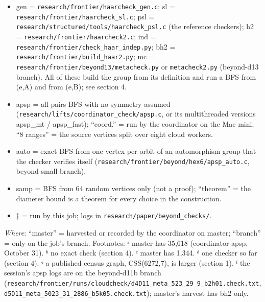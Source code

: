\documentclass[
  10pt,
]{article}
\providecommand{\tightlist}{%
  \setlength{\itemsep}{0pt}\setlength{\parskip}{0pt}}
\begin{document}
\begin{itemize}
\tightlist
\item
  gen = \texttt{research/\allowbreak{}frontier/\allowbreak{}haarcheck\_\allowbreak{}gen.c}; sl = \texttt{research/\allowbreak{}frontier/\allowbreak{}haarcheck\_\allowbreak{}sl.c}; psl =
  \texttt{research/\allowbreak{}structured/\allowbreak{}tools/\allowbreak{}haarcheck\_\allowbreak{}psl.c} (the reference checkers); h2 =
  \texttt{research/\allowbreak{}frontier/\allowbreak{}haarcheck2.c}; ind = \texttt{research/\allowbreak{}frontier/\allowbreak{}check\_\allowbreak{}haar\_\allowbreak{}indep.py}; bh2 =
  \texttt{research/\allowbreak{}frontier/\allowbreak{}build\_\allowbreak{}haar2.py}; mc = \texttt{research/\allowbreak{}frontier/\allowbreak{}beyond13/\allowbreak{}metacheck.py} or
  \texttt{metacheck2.py} (beyond-d13 branch). All of these build the group from its definition and run a BFS from
  (e,A) and from (e,B); see section 4.
\item
  apsp = all-pairs BFS with no symmetry assumed (\texttt{research/\allowbreak{}lifts/\allowbreak{}coordinator\_\allowbreak{}check/\allowbreak{}apsp.c}, or its
  multithreaded versions apsp\_mt / apsp\_fast); ``coord.'' = run by the coordinator on the Mac mini; ``8 ranges'' =
  the source vertices split over eight cloud workers.
\item
  auto = exact BFS from one vertex per orbit of an automorphism group that the checker verifies itself
  (\texttt{research/\allowbreak{}frontier/\allowbreak{}beyond/\allowbreak{}hex6/\allowbreak{}apsp\_\allowbreak{}auto.c}, beyond-small branch).
\item
  samp = BFS from 64 random vertices only (not a proof); ``theorem'' = the diameter bound is a theorem for every
  choice in the construction.
\item
  † = run by this job; logs in \texttt{research/\allowbreak{}paper/\allowbreak{}beyond\_\allowbreak{}checks/\allowbreak{}}.
\end{itemize}

\emph{Where}: ``master'' = harvested or recorded by the coordinator on master; ``branch'' = only on the job's branch.
Footnotes: ᵃ master has 35,618 (coordinator apsp, October 31). ᵇ no exact check (section 4). ᶜ master has 1,344. ᵈ one
checker so far (section 4). ᵉ a published census graph, CSS(6272,7), is larger (section 1). ᶠ the session's apsp logs
are on the beyond-d11b branch (\texttt{research/\allowbreak{}frontier/\allowbreak{}runs/\allowbreak{}cloudcheck/\allowbreak{}d4D11\_\allowbreak{}meta\_\allowbreak{}523\_\allowbreak{}29\_\allowbreak{}9\_\allowbreak{}b2h01.check.txt},
\texttt{d5D11\_\allowbreak{}meta\_\allowbreak{}5023\_\allowbreak{}31\_\allowbreak{}2886\_\allowbreak{}b5k05.check.txt}); master's harvest has bh2 only.
\end{document}
